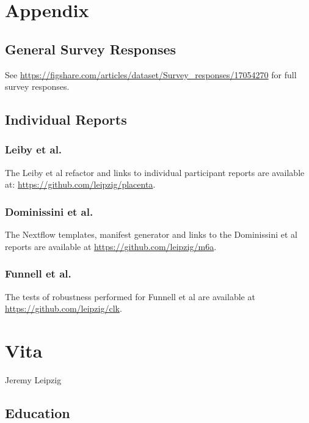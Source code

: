 \documentclass{drexelthesis}
\begin{document}
\newpage

\printbibliography

\section{Appendix}

\subsection{General Survey Responses}

See \url{https://figshare.com/articles/dataset/Survey_responses/17054270} for full survey responses.

\subsection{Individual Reports}

\subsubsection{Leiby et al.}

The Leiby et al refactor and links to individual participant reports are available at: \url{https://github.com/leipzig/placenta}.

\subsubsection{Dominissini et al.}
The Nextflow templates, manifest generator and links to the Dominissini et al reports are available at \url{https://github.com/leipzig/m6a}.

\subsubsection{Funnell et al.}
The tests of robustness performed for Funnell et al are available at \url{https://github.com/leipzig/clk}.

\newpage

\section{Vita}

Jeremy Leipzig

\subsection{Education}
\end{document}
